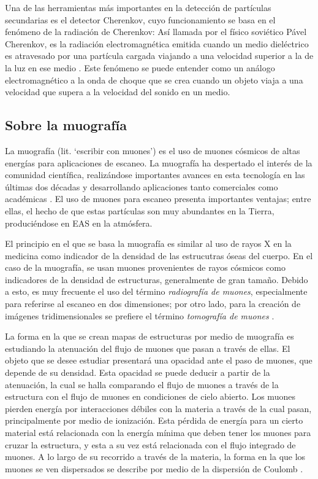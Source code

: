 \documentclass[12pt]{report}
\begin{document}
Una de las herramientas más importantes en la detección de partículas secundarias es el detector Cherenkov, cuyo funcionamiento se basa en el fenómeno de la radiación de Cherenkov: Así llamada por el físico soviético Pável Cherenkov, es la radiación electromagnética emitida cuando un medio dieléctrico es atravesado por una partícula cargada viajando a una velocidad superior a la de la luz en ese medio \cite{jelley1955cerenkov}. Este fenómeno se puede entender como un análogo electromagnético a la onda de choque que se crea cuando un objeto viaja a una velocidad que supera a la velocidad del sonido en un medio.



\subsection*{Sobre la muografía}

La muografía (lit. `escribir con muones') es el uso de muones cósmicos de altas energías para aplicaciones de escaneo. La muografía ha despertado el interés de la comunidad científica, realizándose importantes avances en esta tecnología en las últimas dos décadas y desarrollando aplicaciones tanto comerciales como académicas \cite{kaiser2019muography}. El uso de muones para escaneo presenta importantes ventajas; entre ellas, el hecho de que estas partículas son muy abundantes en la Tierra, produciéndose en EAS en la atmósfera.

El principio en el que se basa la muografía es similar al uso de rayos X en la medicina como indicador de la densidad de las estrucutras óseas del cuerpo. En el caso de la muografía, se usan muones provenientes de rayos cósmicos como indicadores de la densidad de estructuras, generalmente de gran tamaño. Debido a esto, es muy frecuente el uso del término \textit{radiografía de muones}, especialmente para referirse al escaneo en dos dimensiones; por otro lado, para la creación de imágenes tridimensionales se prefiere el término \textit{tomografía de muones} \cite{kaiser2019muography}.

La forma en la que se crean mapas de estructuras por medio de muografía es estudiando la atenuación del flujo de muones que pasan a través de ellas. El objeto que se desee estudiar presentará una opacidad ante el paso de muones, que depende de su densidad. Esta opacidad se puede deducir a partir de la atenuación, la cual se halla comparando el flujo de muones a través de la estructura con el flujo de muones en condiciones de cielo abierto. Los muones pierden energía por interacciones débiles con la materia a través de la cual pasan, principalmente por medio de ionización. Esta pérdida de energía para un cierto material está relacionada con la energía mínima que deben tener los muones para cruzar la estructura, y esta a su vez está relacionada con el flujo integrado de muones. A lo largo de su recorrido a través de la materia, la forma en la que los muones se ven dispersados se describe por medio de la dispersión de Coulomb \cite{lesparre2010geophysical}.
\end{document}
